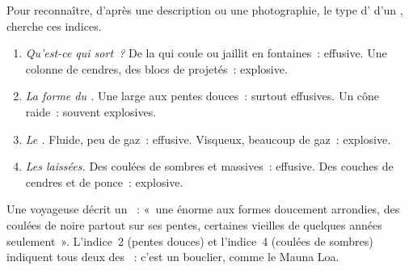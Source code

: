 \begin{method}\label{met:g7:volcanoes:clues}
Pour reconnaître, d'après une description ou une photographie, le type
d' d'un , cherche ces indices.
\begin{enumerate}
  \item \emph{Qu'est-ce qui sort~?} De la  qui coule ou jaillit en
        fontaines~: effusive. Une colonne de cendres, des blocs de 
        projetés~: explosive.
  \item \emph{La forme du .} Une large  aux pentes douces~:
         surtout effusives. Un cône raide~: souvent explosives.
  \item \emph{Le .} Fluide, peu de gaz~: effusive. Visqueux, beaucoup
        de gaz~: explosive.
  \item \emph{Les  laissées.} Des coulées de  sombres et
        massives~: effusive. Des couches de cendres et de ponce~:
        explosive.
\end{enumerate}
\end{method}

\begin{example}\label{ex:g7:volcanoes:clues}
Une voyageuse décrit un ~: «~une énorme  aux formes
doucement arrondies, des coulées de  noire partout sur ses pentes,
certaines vieilles de quelques années seulement~». L'indice~2 (pentes
douces) et l'indice~4 (coulées de  sombres) indiquent tous deux des
~: c'est un  bouclier, comme le Mauna Loa.
\end{example}

